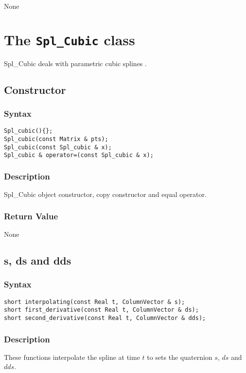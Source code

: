 \documentclass[11pt,fleqn,letterpaper]{report}
\begin{document}
None

\newpage

\section{The \texttt{Spl\_Cubic} class}

Spl\_Cubic deals with parametric cubic splines \cite{Angeles97}.

\subsection*{Constructor}
\subsubsection*{Syntax}
\begin{verbatim}
Spl_cubic(){};
Spl_cubic(const Matrix & pts);
Spl_cubic(const Spl_cubic & x);
Spl_cubic & operator=(const Spl_cubic & x);
\end{verbatim}

\subsubsection*{Description}   
Spl\_Cubic object constructor, copy constructor and equal operator.

\subsubsection*{Return Value}

None

\newpage

\subsection*{s, ds and dds}
\subsubsection*{Syntax}
\begin{verbatim}
short interpolating(const Real t, ColumnVector & s);
short first_derivative(const Real t, ColumnVector & ds);
short second_derivative(const Real t, ColumnVector & dds);
\end{verbatim}

\subsubsection*{Description}   
These functions interpolate the spline at time $t$ to sets the
quaternion $s$, $ds$ and $dds$.
\end{document}
